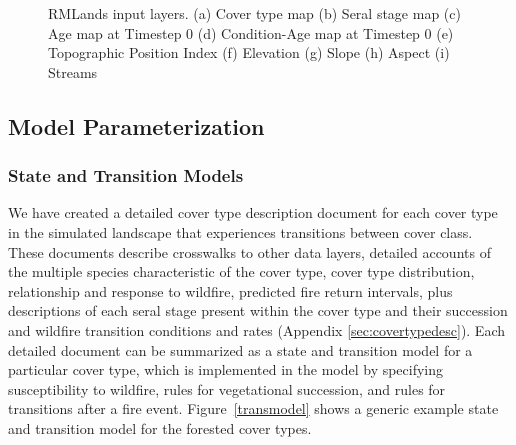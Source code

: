 \begin{figure}[!htbp]
  \centering
   \qquad
	 \qquad
   \qquad
	 \qquad

  \caption{RMLands input layers. (a) Cover type map (b) Seral stage map (c) Age map at Timestep 0 (d) Condition-Age map at Timestep 0 (e) Topographic Position Index (f) Elevation (g) Slope (h) Aspect (i) Streams}
  \label{fig:inputlayermaps}
\end{figure}
\subsection{Model Parameterization}
\label{subsec:hrvmodelparam}

\subsubsection{State and Transition Models}
We have created a detailed cover type description document for each cover type in the simulated landscape that experiences transitions between cover class. These documents describe crosswalks to other data layers, detailed accounts of the multiple species characteristic of the cover type, cover type distribution, relationship and response to wildfire, predicted fire return intervals, plus descriptions of each seral stage present within the cover type and their succession and wildfire transition conditions and rates (Appendix \ref{sec:covertypedesc}). Each detailed document can be summarized as a state and transition model for a particular cover type, which is implemented in the model by specifying susceptibility to wildfire, rules for vegetational succession, and rules for transitions after a fire event. Figure~\ref{transmodel} shows a generic example state and transition model for the forested cover types.

